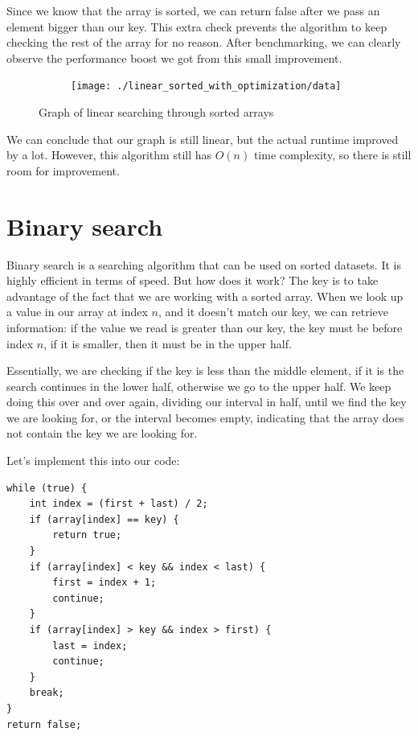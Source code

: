 \documentclass[a4paper,11pt]{article}
\begin{document}
    Since we know that the array is sorted, we can return false after we pass an element bigger than our key.
    This extra check prevents the algorithm to keep checking the rest of the array for no reason.
    After benchmarking, we can clearly observe the performance boost we got from this small improvement.

    \begin{figure}[h]
        \centering
        \begin{subfigure}[b]{.5\textwidth}
            \centering
            \texttt{[image: ./linear\_sorted\_with\_optimization/data]} %
        \end{subfigure}
        \caption{Graph of linear searching through sorted arrays}
        \label{fig:graph_2}
    \end{figure}

    We can conclude that our graph is still linear, but the actual runtime improved by a lot.
    However, this algorithm still has $O(n)$ time complexity, so there is still room for improvement.

    \section*{Binary search}

    Binary search is a searching algorithm that can be used on sorted datasets.
    It is highly efficient in terms of speed.
    But how does it work?
    The key is to take advantage of the fact that we are working with a sorted array.
    When we look up a value in our array at index $n$, and it doesn't match our key, we can retrieve information: if the value we read is greater than our key, the key must be before index $n$, if it is smaller, then it must be in the upper half.

    Essentially, we are checking if the key is less than the middle element, if it is the search continues in the lower half, otherwise we go to the upper half.
    We keep doing this over and over again, dividing our interval in half, until we find the key we are looking for, or the interval becomes empty, indicating that the array does not contain the key we are looking for.

    Let's implement this into our code:

    \begin{verbatim}
while (true) {
    int index = (first + last) / 2;
    if (array[index] == key) {
        return true;
    }
    if (array[index] < key && index < last) {
        first = index + 1;
        continue;
    }
    if (array[index] > key && index > first) {
        last = index;
        continue;
    }
    break;
}
return false;
    \end{verbatim}
\end{document}
